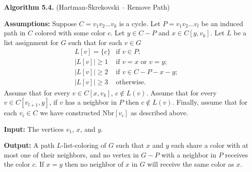 \documentclass[letterpaper, 12pt]{article}
\theoremstyle{thm}
\begin{document}
\noindent\textbf{Algorithm 5.4.} (Hartman-\v{S}krekovski -- Remove Path)

\noindent\textbf{Assumptions:} Suppose $C=v_1v_2\ldots v_k$ is a cycle. Let
$P=v_1v_2\ldots v_l$ be an induced path in $C$ colored with some color $c$. Let
$y\in C-P$ and $x\in C[y,v_k]$. Let $L$ be a list assignment for $G$ such that
for each $v\in G$
\[
    \begin{array}{ll}
        L[v]=\{c\} & \text{if } v\in P;\\
	    \big|L[v]\big|\ge 1 & \text{if } v=x \text{ or } v=y;\\
	    \big|L[v]\big|\ge 2 & \text{if } v\in C-P-x-y;\\
	    \big|L[v]\big|\ge 3 & \text{otherwise.}
    \end{array}
\]
Assume that for every $v\in C[x,v_k]$, $c\not\in L(v)$. Assume that for
every $v\in C[v_{l+1},y]$, if $v$ has a neighbor in $P$ then $c\not\in L(v)$.
Finally, assume that for each $v_i\in C$ we have constructed
$\text{Nbr}[v_i]$ as described above.

\noindent\textbf{Input:} The vertices $v_1$, $x$, and $y$.

\noindent\textbf{Output:} A path $L$-list-coloring of $G$ such that $x$ and
$y$ each share a color with at most one of their neighbors, and no vertex in
$G-P$ with a neighbor in $P$ receives the color $c$. If $x=y$ then no neighbor
of $x$ in $G$ will receive the same color as $x$.

\begin{comment}
\begin{figure}
\begin{center}
\begin{tikzpicture}
  \node (c_n) [label=above left:$v_k$, fill] at (-1.5cm, 1.25cm) {};
  \node (p) [label=above:{$v_1$}] at (0cm, 2cm) {};
  \node (p_label) [draw=none, scale=0.8] at (0cm, 2cm) {};
  \node (c_1) [label=above:$v_2$] at (1.5cm, 1.25cm) {};
  \node (c_i) [label=below:$u$] at (0cm, -1cm) {};
  \node (G_0) [draw=none, fill=none] at (-0.75cm, 0.12cm) {$C_1$};
  \node (G_1) [draw=none, fill=none] at (0.7cm, 0.5cm) {$C_2$};
  
  \draw (c_i) edge [bend left] (c_n) [dashed];
  \draw (c_n) edge [bend left] (c_i) [dashed];
  \draw (c_n) edge (p);
  \draw (p) edge (c_1);
  \draw (p) edge (c_i);
  \draw (c_1) edge [bend left] (c_i) [dashed];
\end{tikzpicture}
\end{center}

\caption{The cycles $C_1$ and $C_2$.}
\end{figure}
\end{comment}
\end{document}
